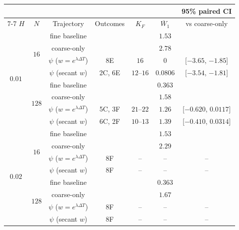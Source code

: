 \setlength{\tabcolsep}{10pt}\renewcommand{\arraystretch}{1.15}
\begin{tabular}{@{}ccccccc@{}}\toprule
& & & & & & 95\% paired CI\\
\cmidrule(lr){7-7}
$H$ & $N$ & Trajectory & Outcomes & $K_F$ & $\overline{W}_1$ & vs coarse-only\\
\midrule
\multirow{8}{*}{$0.01$} & \multirow{4}{*}{$16$} & fine baseline &  &  & $1.53$ & \\*
 &  & coarse-only &  &  & $2.78$ & \\*
 &  & $\psi$ ($w=e^{\lambda\Delta T}$) & 8E & $16$ & $0$ & [$-3.65$, $-1.85$]\\*
 &  & $\psi$ (secant $w$) & 2C, 6E & $12$--$16$ & $0.0806$ & [$-3.54$, $-1.81$]\\
\addlinespace[3pt]
 & \multirow{4}{*}{$128$} & fine baseline &  &  & $0.363$ & \\*
 &  & coarse-only &  &  & $1.58$ & \\*
 &  & $\psi$ ($w=e^{\lambda\Delta T}$) & 5C, 3F & $21$--$22$ & $1.26$ & [$-0.620$, $0.0117$]\\*
 &  & $\psi$ (secant $w$) & 6C, 2F & $10$--$13$ & $1.39$ & [$-0.410$, $0.0314$]\\
\midrule
\multirow{8}{*}{$0.02$} & \multirow{4}{*}{$16$} & fine baseline &  &  & $1.53$ & \\*
 &  & coarse-only &  &  & $2.29$ & \\*
 &  & $\psi$ ($w=e^{\lambda\Delta T}$) & 8F & -- & -- & --\\*
 &  & $\psi$ (secant $w$) & 8F & -- & -- & --\\
\addlinespace[3pt]
 & \multirow{4}{*}{$128$} & fine baseline &  &  & $0.363$ & \\*
 &  & coarse-only &  &  & $1.67$ & \\*
 &  & $\psi$ ($w=e^{\lambda\Delta T}$) & 8F & -- & -- & --\\*
 &  & $\psi$ (secant $w$) & 8F & -- & -- & --\\
\bottomrule\end{tabular}

